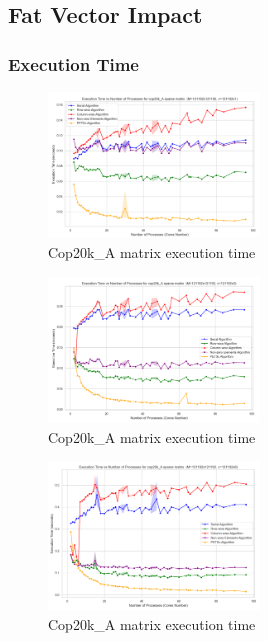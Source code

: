 \documentclass[12pt,oneside]{book} %
\begin{document}
\subsection{Fat Vector Impact}
\subsubsection{Execution Time}

\begin{figure}[H]
    \centering
    \includegraphics[width=0.5\textwidth]{../results/fat_vector_dim/cop20k_A_k1_execution_time.png}
    \caption{Cop20k\_A matrix execution time}\label{fig:cop20k-a-k1-execution-time}
\end{figure}

\begin{figure}[H]
    \centering
    \includegraphics[width=0.5\textwidth]{../results/fat_vector_dim/cop20k_A_k3_execution_time.png}
    \caption{Cop20k\_A matrix execution time}\label{fig:cop20k-a-k3-execution-time}
\end{figure}

\begin{figure}[H]
    \centering
    \includegraphics[width=0.5\textwidth]{../results/fat_vector_dim/cop20k_A_k6_execution_time.png}
    \caption{Cop20k\_A matrix execution time}\label{fig:cop20k-a-k6-execution-time-2}
\end{figure}
\end{document}
